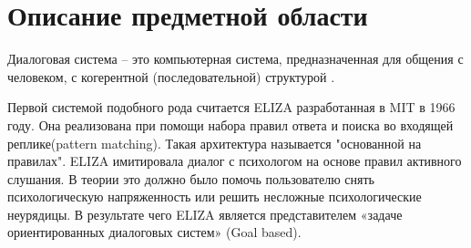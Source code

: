 \chapter{Описание предметной области}
Диалоговая система – это компьютерная система, предназначенная для общения с человеком, с когерентной (последовательной) структурой \cite{dialog_jur}.

Первой системой подобного рода считается ELIZA разработанная в MIT в 1966 году. Она реализована при помощи набора правил ответа и поиска во входящей реплике(pattern matching). Такая архитектура называется  "основанной на правилах". ELIZA имитировала диалог с психологом на основе правил активного слушания. В теории это должно было помочь пользователю снять психологическую напряженность или решить несложные психологические неурядицы.  В результате чего ELIZA является представителем «задаче ориентированных диалоговых систем» (Goal based). 